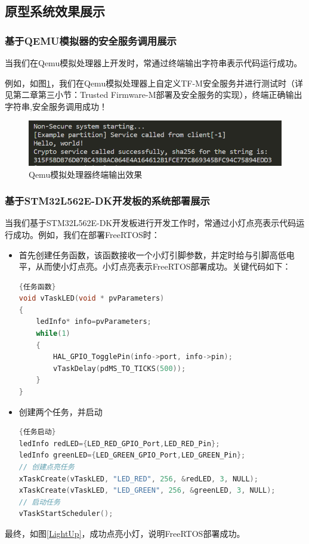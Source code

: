 \documentclass[UTF8,12pt,a4paper,twoside]{ctexart}
\numberwithin{figure}{section}
\begin{document}
\subsection{原型系统效果展示}
\subsubsection{基于QEMU模拟器的安全服务调用展示}
\par 当我们在Qemu模拟处理器上开发时，常通过终端输出字符串表示代码运行成功。
\par 例如，如图\ref{terminal}，我们在Qemu模拟处理器上自定义TF-M安全服务并进行测试时（详见第二章第三小节：Trusted Firmware-M部署及安全服务的实现），终端正确输出字符串,安全服务调用成功！

\begin{figure}[H]
    \centering
    \includegraphics[scale=1.1]{graph/terminal output.png}
    \caption{Qemu模拟处理器终端输出效果}
    \label{terminal}
\end{figure}

\subsubsection{基于STM32L562E-DK开发板的系统部署展示}
\par 当我们基于STM32L562E-DK开发板进行开发工作时，常通过小灯点亮表示代码运行成功。例如，我们在部署FreeRTOS时：
\begin{itemize}
    \item[1)]首先创建任务函数，该函数接收一个小灯引脚参数，并定时给与引脚高低电平，从而使小灯点亮。小灯点亮表示FreeRTOS部署成功。关键代码如下：
    \begin{lstlisting}[language=C]{任务函数}
void vTaskLED(void * pvParameters) 
{ 
    ledInfo* info=pvParameters; 
    while(1) 
    { 
        HAL_GPIO_TogglePin(info->port, info->pin); 
        vTaskDelay(pdMS_TO_TICKS(500)); 
    } 
} \end{lstlisting}
    \item[2)]创建两个任务，并启动
    \begin{lstlisting}[language=C]{任务启动}
ledInfo redLED={LED_RED_GPIO_Port,LED_RED_Pin}; 
ledInfo greenLED={LED_GREEN_GPIO_Port,LED_GREEN_Pin}; 
// 创建点亮任务 
xTaskCreate(vTaskLED, "LED_RED", 256, &redLED, 3, NULL); 
xTaskCreate(vTaskLED, "LED_GREEN", 256, &greenLED, 3, NULL); 
// 启动任务 
vTaskStartScheduler(); \end{lstlisting}
\end{itemize}
最终，如图\ref{LightUp}，成功点亮小灯，说明FreeRTOS部署成功。
\end{document}
